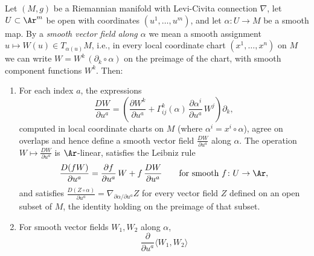 \begin{lemma}
\label{lem:covariant-derivative-along-maps}
\leanok
{}
Let $(M,g)$ be a Riemannian manifold with Levi-Civita connection
$\nabla$, let $U\subset\Ar^m$ be open with coordinates
$(u^1,\ldots,u^m)$, and let $\alpha\colon U\to M$ be a smooth map. By a
{\em smooth vector field along $\alpha$} we mean a smooth assignment
$u\mapsto W(u)\in T_{\alpha(u)}M$, i.e., in every local coordinate chart
$(x^1,\ldots,x^n)$ on $M$ we can write $W=W^k\,(\partial_k\circ\alpha)$
on the preimage of the chart, with smooth component functions $W^k$.
Then:
\begin{enumerate}
\item For each index $a$, the expressions
$$\frac{DW}{\partial u^a}
=\left(\frac{\partial W^k}{\partial u^a}
+\Gamma^k_{ij}(\alpha)\,\frac{\partial\alpha^i}{\partial u^a}\,W^j\right)
\partial_k ,$$
computed in local coordinate charts on $M$ (where
$\alpha^i=x^i\circ\alpha$), agree on overlaps and hence define a smooth
vector field $\frac{DW}{\partial u^a}$ along $\alpha$. The operation
$W\mapsto\frac{DW}{\partial u^a}$ is $\Ar$-linear, satisfies the Leibniz
rule
$$\frac{D(fW)}{\partial u^a}
=\frac{\partial f}{\partial u^a}\,W+f\,\frac{DW}{\partial u^a}
\qquad\text{for smooth } f\colon U\to\Ar,$$
and satisfies
$\frac{D(Z\circ\alpha)}{\partial u^a}=\nabla_{\partial\alpha/\partial
u^a}Z$ for every vector field $Z$ defined on an open subset of $M$, the
identity holding on the preimage of that subset.
\item For smooth vector fields $W_1,W_2$ along $\alpha$,
$$\frac{\partial}{\partial u^a}\langle W_1,W_2\rangle
$$
\end{enumerate}
\end{lemma}
